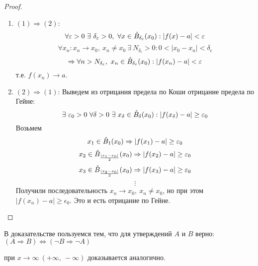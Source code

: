         \begin{proof}\tab
            \begin{enumerate}
                \item $(1)\Rightarrow(2)$: 
                \[\forall \epsilon>0\ \exists\ \delta_{\epsilon}>0,\ \forall x\in \Bo_{\delta_{\epsilon}}(x_0): |f(x)-a|<\epsilon\]
                \[\forall x_n: x_n\to x_0,\ x_n\ne x_0\ \exists\ N_{\delta_{\epsilon}}>0: 0<|x_0-x_n|<\delta_{\epsilon}\]
                \[\Rightarrow \forall n> N_{\delta_{\varepsilon}},\ x_n\in \mathring{B}_{\delta_{\varepsilon}}(x_0): |f(x_n)-a|<\varepsilon\] т.е. $f(x_n)\to a$.
                \item $(2)\Rightarrow(1)$: Выведем из отрицания предела по Коши отрицание предела по Гейне: 
                \[\exists\ \epsilon_0> 0\ \forall \delta>0\ \exists\ x_{\delta}\in \Bo_{\delta}(x_0): |f(x_{\delta})-a|\geq \epsilon_0\]
                Возьмем 
                \[x_1 \in \mathring{B}_1(x_0) \Rightarrow |f(x_1)-a|\geq \varepsilon_0\] 
                \[x_2 \in \mathring{B}_{\frac{|x_1-x_0|}{2}}(x_0) \Rightarrow |f(x_2)-a|\geq \varepsilon_0\]
                \[x_3\in \mathring{B}_{\frac{|x_2-x_0|}{2}}(x_0) \Rightarrow |f(x_3)-a|\geq \varepsilon_0\]
                \[\vdots\]
                Получили последовательность $x_n\to x_0,\ x_n\ne x_0$, но при этом\\
                $|f(x_n)-a|\geq \epsilon_0$. Это и есть отрицание по Гейне.
            \end{enumerate}
        \end{proof} 
        \begin{comm}
            В доказательстве пользуемся тем, что для утверждений $A$ и $B$ верно: $(A\Rightarrow B) \Leftrightarrow (\lnot B\Rightarrow \lnot A)$
        \end{comm} 
        \begin{comm}
            при $x\to \infty\ (+\infty,\ -\infty)$ доказывается аналогично.
        \end{comm}
